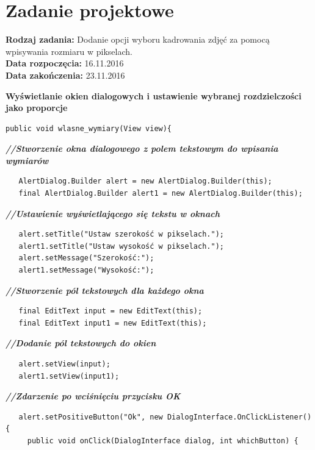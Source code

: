 \section{Zadanie projektowe}
\noindent\textbf{Rodzaj zadania:}   Dodanie opcji wyboru kadrowania zdjęć za pomocą wpisywania rozmiaru w pikselach.\\

\noindent\textbf{Data rozpoczęcia:} 16.11.2016\\

\noindent\textbf{Data zakończenia:} 23.11.2016\\
\begin{center}
\textbf{Wyświetlanie okien dialogowych i ustawienie wybranej rozdzielczości jako proporcje}
\end{center}
\begin{verbatim}
public void wlasne_wymiary(View view){\end{verbatim}
                          \textit{\textbf{//Stworzenie okna dialogowego z polem tekstowym do wpisania wymiarów}}
                            \begin{verbatim}
   AlertDialog.Builder alert = new AlertDialog.Builder(this);
   final AlertDialog.Builder alert1 = new AlertDialog.Builder(this);\end{verbatim}
                             \textit{\textbf{//Ustawienie wyświetlającego się tekstu w oknach}}
                               \begin{verbatim}
   alert.setTitle("Ustaw szerokość w pikselach.");
   alert1.setTitle("Ustaw wysokość w pikselach.");
   alert.setMessage("Szerokość:");
   alert1.setMessage("Wysokość:");\end{verbatim}
                             \textit{\textbf{//Stworzenie pól tekstowych dla każdego okna}}
                               \begin{verbatim}
   final EditText input = new EditText(this);
   final EditText input1 = new EditText(this);\end{verbatim}
                             \textit{\textbf{//Dodanie pól tekstowych do okien}}
                               \begin{verbatim}
   alert.setView(input);
   alert1.setView(input1);\end{verbatim}
                          \textit{\textbf{//Zdarzenie po wciśnięciu przycisku OK}}
                            \begin{verbatim}
   alert.setPositiveButton("Ok", new DialogInterface.OnClickListener() {
     public void onClick(DialogInterface dialog, int whichButton) {\end{verbatim}
